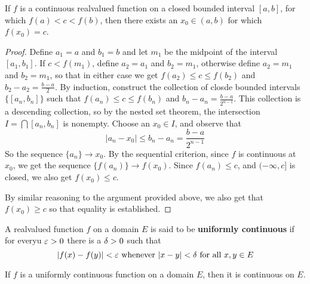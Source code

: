 \begin{theorem}\label{1.3.4}
    If $f$ is a continuous realvalued function on a closed bounded interval
    $[a,b]$, for which $f(a)<c<f(b)$, then there exists an $x_0 \in (a,b)$ for
    which $f(x_0)=c$.
\end{theorem}
\begin{proof}
    Define $a_1=a$ and $b_1=b$ and let $m_1$ be the midpoint of the interval
    $[a_1,b_1]$. If $c<f(m_1)$, define $a_2=a_1$ and $b_2=m_1$, otherwise define
    $a_2=m_1$ and $b_2=m_1$, so that in either case we get $f(a_2) \leq c \leq
    f(b_2)$ and $b_2-a_2=\frac{b-a}{2}$. By induction, construct the collection
    of closde bounded intervals $\{[a_n,b_n]\}$ such that $f(a_n) \leq c \leq
    f(b_n)$ and $b_n-a_n=\frac{b-a}{2^{n-1}}$. This collection is a descending
    collection, so by the nested set theorem, the intersection
    $I=\bigcap{[a_n,b_n]}$ is nonempty. Choose an $x_0 \in I$, and observe that
    \begin{equation*}
        |a_n-x_0| \leq b_n-a_n=\frac{b-a}{2^{n-1}}
    \end{equation*}
    So the sequence $\{a_n\} \xrightarrow{} x_0$. By the sequential criterion,
    since $f$ is continuous at  $x_0$, we get the sequence $\{f(a_n)\}
    \xrightarrow{} f(x_0)$. Since $f(a_n) \leq c$, and $(-\infty,c]$ is closed,
    we also get $f(x_0) \leq c$.

    By similar reasoning to the argument provided above, we also get that
    $f(x_0) \geq c$ so that equality is established.
\end{proof}

\begin{definition}
    A realvalued function $f$ on a domain $E$ is said to be \textbf{uniformly
    continuous} if for everyu $\varepsilon>0$ there is a  $\delta>0$ such that
    \begin{equation*}
        |f(x)-f(y)|<\varepsilon \text{ whenever } |x-y|<\delta \text{ for all } x,y \in E
    \end{equation*}
\end{definition}

\begin{lemma}\label{1.3.5}
    If $f$ is a uniformly continuous function on a domain  $E$, then it is
    continuous on  $E$.
\end{lemma}

